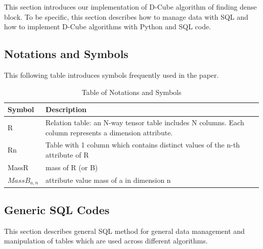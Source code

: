 This section introduces our implementation of D-Cube algorithm of finding dense block. To be specific, this section describes how to manage data with SQL and how to implement D-Cube algorithms with Python and SQL code.
\subsection{Notations and Symbols}
This following table introduces symbols frequently used in the paper.
 
\begin{table}[h!]
\centering
\begin{tabular}{|p{3cm}|p{10cm}|}
 \hline
 Symbol & Description \\ [0.5ex] 
 \hline\hline
 R & Relation table: an N-way tensor table includes N columns.  Each column represents a dimension attribute. \\
 \hline
 Rn & Table with 1 column which contains distinct values of the n-th attribute of R \\ 
 \hline
 MassR & mass of R (or B) \\ 
 \hline
 $MassB_{a,n}$ & attribute value mass of a in dimension n \\[1ex]
 \hline
\end{tabular}
\caption{Table of Notations and Symbols}
\label{table:1}
\end{table}

\subsection{Generic SQL Codes}
This section describes general SQL method for general data management and manipulation of tables which are used across different algorithms.

